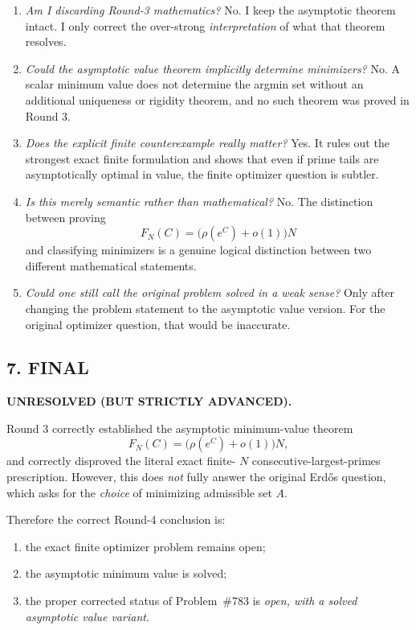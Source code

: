\begin{enumerate}
	\item \emph{Am I discarding Round-3 mathematics?}  
	No.  I keep the asymptotic theorem intact.  I only correct the over-strong \emph{interpretation} of what that theorem resolves.
	
	\item \emph{Could the asymptotic value theorem implicitly determine minimizers?}  
	No.  A scalar minimum value does not determine the argmin set without an additional uniqueness or rigidity theorem, and no such theorem was proved in Round 3.
	
	\item \emph{Does the explicit finite counterexample really matter?}  
	Yes.  It rules out the strongest exact finite formulation and shows that even if prime tails are asymptotically optimal in value, the finite optimizer question is subtler.
	
	\item \emph{Is this merely semantic rather than mathematical?}  
	No.  The distinction between proving
	\[
	F_N(C)=\bigl(\rho(e^C)+o(1)\bigr)N
	\]
	and classifying minimizers is a genuine logical distinction between two different mathematical statements.
	
	\item \emph{Could one still call the original problem solved in a weak sense?}  
	Only after changing the problem statement to the asymptotic value version.  For the original optimizer question, that would be inaccurate.
\end{enumerate}

\subsection*{7. FINAL}

\textbf{UNRESOLVED (BUT STRICTLY ADVANCED).}

Round 3 correctly established the asymptotic minimum-value theorem
\[
F_N(C)=\bigl(\rho(e^C)+o(1)\bigr)N,
\]
and correctly disproved the literal exact finite-
$N$ consecutive-largest-primes prescription.  However, this does \emph{not} fully answer the original Erd\H{o}s question, which asks for the \emph{choice} of minimizing admissible set $A$.

Therefore the correct Round-4 conclusion is:

\begin{enumerate}
	\item the exact finite optimizer problem remains open;
	\item the asymptotic minimum value is solved;
	\item the proper corrected status of Problem~\#783 is \emph{open, with a solved asymptotic value variant}.
\end{enumerate}

